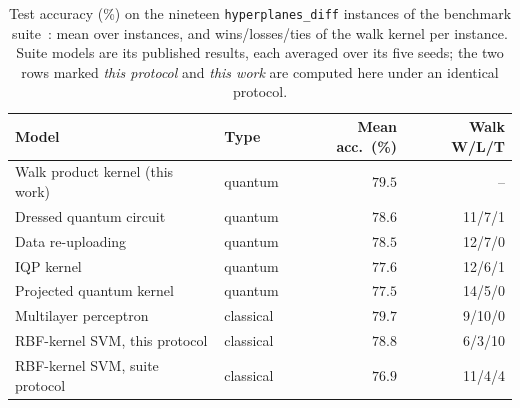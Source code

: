 \begin{table}[htbp]
\centering
\caption[Hyperplanes task: walk kernel against the benchmark suite]{Test accuracy (\%) on the nineteen \texttt{hyperplanes\_diff} instances of the benchmark suite~\cite{Bowles_2024}: mean over instances, and wins/losses/ties of the walk kernel per instance. Suite models are its published results, each averaged over its five seeds; the two rows marked \emph{this protocol} and \emph{this work} are computed here under an identical protocol.}
\label{tab:kernelhp}
\begin{tabular}{llrr}
\hline
Model & Type & Mean acc.\ (\%) & Walk W/L/T \\
\hline
Walk product kernel (this work) & quantum & $79.5$ & -- \\
Dressed quantum circuit & quantum & $78.6$ & 11/7/1 \\
Data re-uploading & quantum & $78.5$ & 12/7/0 \\
IQP kernel & quantum & $77.6$ & 12/6/1 \\
Projected quantum kernel & quantum & $77.5$ & 14/5/0 \\
Multilayer perceptron & classical & $79.7$ & 9/10/0 \\
RBF-kernel SVM, this protocol & classical & $78.8$ & 6/3/10 \\
RBF-kernel SVM, suite protocol & classical & $76.9$ & 11/4/4 \\
\hline
\end{tabular}
\end{table}
